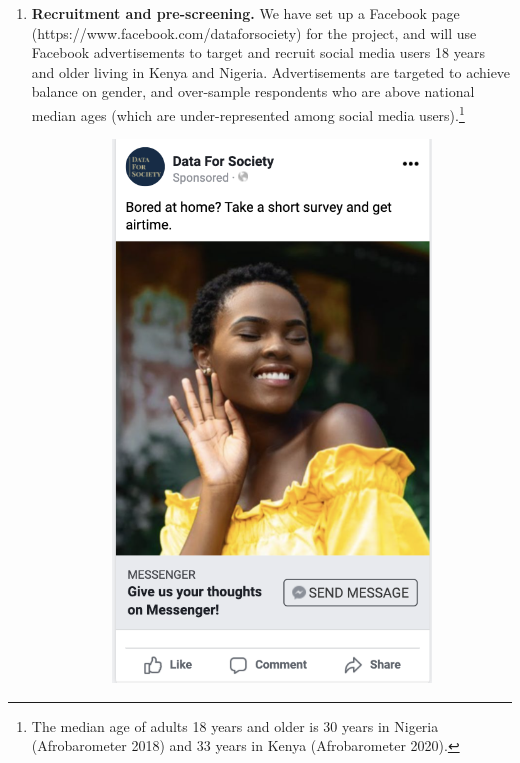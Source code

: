 \documentclass[letterpaper, 12pt, parskip=full,DIV=10]{scrartcl}
\begin{document}
\begin{enumerate}
\item \textbf{Recruitment and pre-screening.} We have set up a Facebook page (https://www.facebook.com/dataforsociety) for the project, and will use Facebook advertisements to target and recruit social media users 18 years and older living in Kenya and Nigeria. Advertisements are targeted to achieve balance on gender, and over-sample respondents who are above national median ages (which are under-represented among social media users).\footnote{The median age of adults 18 years and older is 30 years in Nigeria (Afrobarometer 2018) and 33 years in Kenya (Afrobarometer 2020).}

\begin{figure}[h!]
   \centering
   \begin{subfigure}{0.45\textwidth}
  \centering
  \includegraphics[width = \textwidth]{../../tables-figures/ad1.png} 

\end{subfigure}
\end{figure}
\end{enumerate}
\end{document}
